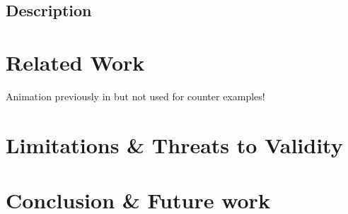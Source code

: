 \documentclass[runningheads]{llncs}
\begin{document}
\subsection{Description}
\cite{camundaservicesgmbhBpmnjs2024}

\section{Related Work}


\cite{krauterFormalizationAnalysisBPMN2023,krauterHigherorderTransformationApproach2023}

\cite{vangorpVisualTokenbasedFormalization2013}

\cite{corradiniBProVeToolSupport2017,corradiniFormalApproachAnalysis2021}

\cite{houhouFirstOrderLogicSemantics2019,houhouFirstOrderLogicVerification2022}

Animation previously in \cite{corradiniFormalisingAnimatingMultiple2022,camundaservicesgmbhBpmnjsTokenSimulation2024} but not used for counter examples!


\section{Limitations \& Threats to Validity}



\section{Conclusion \& Future work}




\end{document}
